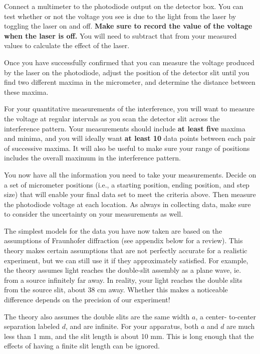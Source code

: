 \documentclass[11pt]{article}
\begin{document}
Connect a multimeter to the photodiode output on the detector box. You can test
whether or not the voltage you see is due to the light from the laser by
toggling the laser on and off. {\bf Make sure to record the value of the voltage 
when the laser is off.} You will need to subtract that from your measured values to
calculate the effect of the laser.

Once you have successfully confirmed that you can measure the voltage produced 
by the laser on the photodiode, adjust the position of the detector slit until you
find two different maxima in the micrometer, and determine the distance between
these maxima.

For your quantitative measurements of the interference, you will want to measure 
the voltage at regular intervals as you scan the detector slit across the interference
pattern. Your measurements should include \textbf{at least five} maxima and minima, 
and you will ideally want \textbf{at least 10} data points between each
pair of successive maxima. It will also be useful to make sure your range of
positions includes the overall maximum in the interference pattern.

You now have all the information you need to take your measurements. Decide on a 
set of micrometer positions (i.e., a starting position, ending position, and step 
size) that will enable your final data set to meet the criteria above. Then measure
the photodiode voltage at each location. As always in collecting data, make sure
 to consider the uncertainty on your measurements as well. 

\vspace{5mm}


The simplest models for the data you have now taken are based on the assumptions
of Fraunhofer diffraction (see appendix below for a review). This theory makes certain
assumptions that are not perfectly accurate for a realistic experiment, but we can 
still use it if they approximately satisfied. For example, the theory assumes light reaches the double-slit assembly as a plane wave, ie. from a source infinitely far away.
In reality, your light reaches the double slits from the source slit, about 38
cm away. Whether this makes a noticeable difference depends on the precision of our experiment!

The theory also assumes the double slits are the same width $a$, a center-
to-center separation labeled $d$, and are infinite. For your apparatus,
both $a$ and $d$ are much less than 1 mm, and the slit length is about 10 mm.
This is long enough that the effects of having a finite slit length can be
ignored.
\end{document}
